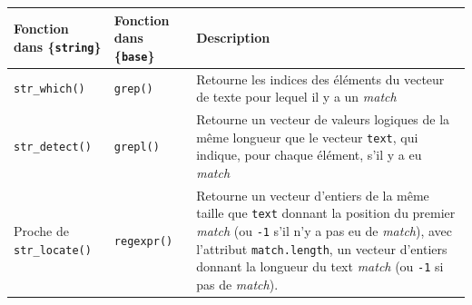 \documentclass[
  11pt,
]{book}
\numberwithin{equation}{section}
\numberwithin{countremarque}{section}
\begin{document}
\begin{longtable}[]{@{}lll@{}}
\toprule
\begin{minipage}[b]{0.30\columnwidth}\raggedright
Fonction dans \{\texttt{string}\}\strut
\end{minipage} & \begin{minipage}[b]{0.30\columnwidth}\raggedright
Fonction dans \{\texttt{base}\}\strut
\end{minipage} & \begin{minipage}[b]{0.30\columnwidth}\raggedright
Description\strut
\end{minipage}\tabularnewline
\midrule
\endhead
\begin{minipage}[t]{0.30\columnwidth}\raggedright
\texttt{str\_which()}\strut
\end{minipage} & \begin{minipage}[t]{0.30\columnwidth}\raggedright
\texttt{grep()}\strut
\end{minipage} & \begin{minipage}[t]{0.30\columnwidth}\raggedright
Retourne les indices des éléments du vecteur de texte pour lequel il y a un \emph{match}\strut
\end{minipage}\tabularnewline
\begin{minipage}[t]{0.30\columnwidth}\raggedright
\texttt{str\_detect()}\strut
\end{minipage} & \begin{minipage}[t]{0.30\columnwidth}\raggedright
\texttt{grepl()}\strut
\end{minipage} & \begin{minipage}[t]{0.30\columnwidth}\raggedright
Retourne un vecteur de valeurs logiques de la même longueur que le vecteur \texttt{text}, qui indique, pour chaque élément, s'il y a eu \emph{match}\strut
\end{minipage}\tabularnewline
\begin{minipage}[t]{0.30\columnwidth}\raggedright
Proche de \texttt{str\_locate()}\strut
\end{minipage} & \begin{minipage}[t]{0.30\columnwidth}\raggedright
\texttt{regexpr()}\strut
\end{minipage} & \begin{minipage}[t]{0.30\columnwidth}\raggedright
Retourne un vecteur d'entiers de la même taille que \texttt{text} donnant la position du premier \emph{match} (ou \texttt{-1} s'il n'y a pas eu de \emph{match}), avec l'attribut \texttt{match.length}, un vecteur d'entiers donnant la longueur du text \emph{match} (ou \texttt{-1} si pas de \emph{match}).\strut

\end{minipage}
\end{longtable}
\end{document}
